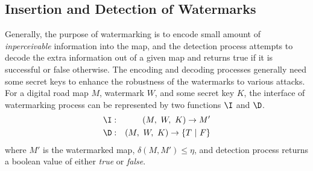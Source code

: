 \subsection{Insertion and Detection of Watermarks}
Generally, the purpose of watermarking is to encode small amount of
{\em inperceivable} information into the map, 
and the detection process attempts to 
decode the extra information out of a given map and returns true if it is 
successful or false otherwise. 
The encoding and decoding processes generally need 
some secret keys to enhance the robustness of the watermarks 
to various attacks. 
For a digital road map $M$, watermark $W$, and some secret key $K$, the 
interface of watermarking process can be represented by two functions 
$\I$ and  $\D$.
\begin{eqnarray*}
\I &:& (M,~W,~K) \rightarrow M' \\
\D &:& (M,~W,~K) \rightarrow \{T~|~F\} 
\end{eqnarray*}
\noindent
where $M'$ is the watermarked map, %
$\delta(M, M') \le \eta$, and detection process returns a boolean value
of either {\em true} or {\em false}.




